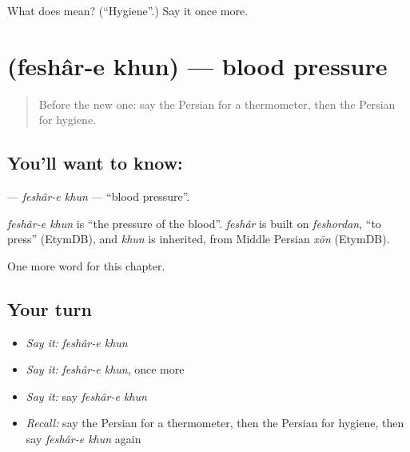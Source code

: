 \begin{tcolorbox}[breakable,colback=teal!4,colframe=teal!35!black,title={Before you move on}]
What does  mean? (\textquotedblleft{}Hygiene\textquotedblright{}.) Say it once more.
\end{tcolorbox}
\section[\texorpdfstring{\fa{فشار} \fa{خون} (feshâr-e khun)}{فشار خون (feshâr-e khun)}]{  (feshâr-e khun) — blood pressure}

\label{lesson:FA-C190-feshar-e-khun}



\begin{quote}
Before the new one: say the Persian for a thermometer, then the Persian for hygiene.
\end{quote}

\subsection*{You'll want to know:  }
\textbf{ } — \emph{feshâr-e khun} — \textquotedblleft{}blood pressure\textquotedblright{}.

\begin{cousinweb}
\emph{feshâr-e khun} is \textquotedblleft{}the pressure of the blood\textquotedblright{}. \emph{feshâr} is built on \emph{feshordan}, \textquotedblleft{}to press\textquotedblright{} (EtymDB), and \emph{khun} is inherited, from Middle Persian \emph{xōn} (EtymDB).
\end{cousinweb}

\begin{grammarlens}[title={What you've built}]
One more word for this chapter.
\end{grammarlens}

\subsection*{Your turn}
\begin{itemize}
\raggedright
  \item \emph{Say it:} \emph{feshâr-e khun}
  \item \emph{Say it:} \emph{feshâr-e khun}, once more
  \item \emph{Say it:} say \emph{feshâr-e khun}
  \item \emph{Recall:} say the Persian for a thermometer, then the Persian for hygiene, then say \emph{feshâr-e khun} again
\end{itemize}

